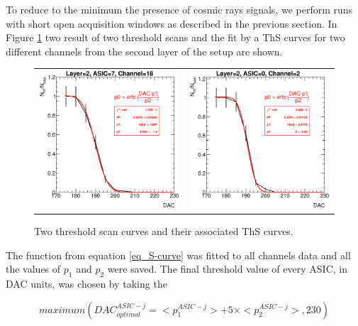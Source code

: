 \documentclass[a4paper,11pt]{article}
\begin{document}
To reduce to the minimum the presence of cosmic rays signals, 
we perform runs with short open acquisition windows
as described in the previous section.
In Figure \ref{scurve_channels} 
two result of two threshold scans and the fit by
a ThS curves for two different channels from the second layer of the setup are shown.

\begin{figure}[!t]
  \centering
  \begin{tabular}{ll}
  \includegraphics[width=2.8in]{../figs/commissioning/scurve_chn18_asic7_layer2.eps} & \includegraphics[width=2.8in]{../figs/commissioning/scurve_chn2_asic0_layer2.eps}
  \end{tabular}
\caption{Two threshold scan curves and their associated ThS curves.}
\label{scurve_channels}
\end{figure}

The function from equation \ref{eq_S-curve} was fitted to all
channels data and all the values of $p_{1}$ and $p_{2}$ were saved.
The final threshold value of every ASIC, in DAC units, was chosen 
by taking the 

\begin{equation}
maximum(DAC_{optimal}^{ASIC-j} = <p_{1}^{ASIC-j}> + 5 \times <p_{2}^{ASIC-j}>,230)
\end{equation}
\end{document}

